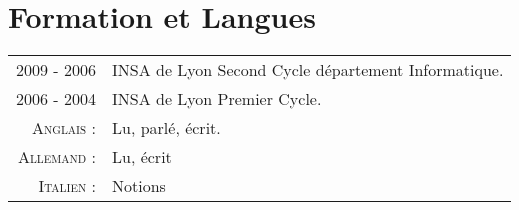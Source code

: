 \documentclass[a4paper,10pt]{article}
\begin{document}
\section{Formation et Langues}
\begin{tabular}{rl}
  \textsc{2009 - 2006}  & INSA de Lyon Second Cycle département Informatique.         \\
  \textsc{2006 - 2004}  & INSA de Lyon Premier Cycle.                                 \\
  \textsc{Anglais :}    & Lu, parlé, écrit.                                           \\
  \textsc{Allemand :}   & Lu, écrit                                                   \\
  \textsc{Italien :}    & Notions                                                     \\
\end{tabular}
\end{document}
